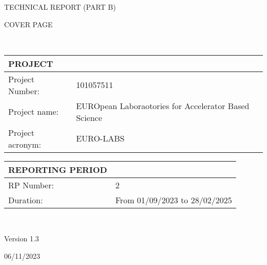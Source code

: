 %
%


\vspace*{-0.05cm}

{\fontsize{12}{15}\bf\color{mycayenne}
        \centerline{TECHNICAL REPORT (PART B)}
        
        COVER PAGE}\\%
  \setlength{\parindent}{0pt}
  
  \def\arraystretch{1.25}
  {\fontsize{9}{11}\selectfont
  \begin{tabular}[t]{!{\color{mygray}\vrule}p{.25\linewidth}!{\color{mygray}\vrule}p{.6885\linewidth}!{\color{mygray}\vrule}} \hline
    {\rule{0pt}{2.5ex}\color{myblack}\bf PROJECT} \\ \hline
    Project Number: & 101057511 \\ \hline
    Project name: & EUROpean Laboraotories for Accelerator Based Science \\ \hline
    Project acronym: & EURO-LABS \\
    \hline
  \end{tabular}

  \vspace*{1cm}
  
  \begin{tabular}[t]{!{\color{mygray}\vrule}p{.25\linewidth}!{\color{mygray}\vrule}p{.6885\linewidth}!{\color{mygray}\vrule}} \hline
    {\rule{0pt}{2.5ex}\color{myblack}\bf REPORTING PERIOD} \\ \hline
    RP Number: & 2 \\ \hline
    Duration: & From 01/09/2023 to 28/02/2025 \\ \hline
  \end{tabular}
}\\[3ex]

\begin{center}
    \vspace*{2cm}
    
    Version 1.3

    \vspace*{0.5cm}
    06/11/2023
\end{center}
\clearpage
\restoregeometry